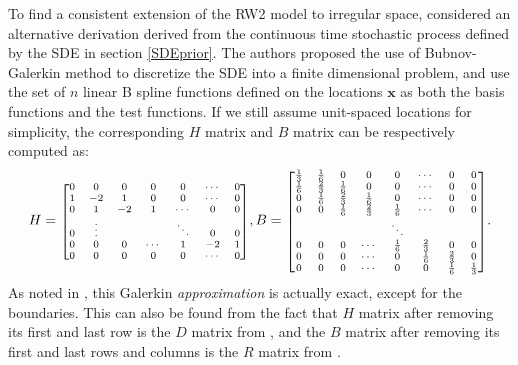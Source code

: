 \documentclass{article}
\begin{document}
To find a consistent extension of the RW2 model to irregular space, \citep{rw2} considered an alternative derivation derived from the continuous time stochastic process defined by the SDE in section \ref{SDEprior}. The authors proposed the use of Bubnov-Galerkin method to discretize the SDE into a finite dimensional problem, and use the set of $n$ linear B spline functions defined on the locations $\boldsymbol{x}$ as both the basis functions and the test functions. If we still assume unit-spaced locations for simplicity, the corresponding $H$ matrix and $B$ matrix can be respectively computed as:
\begin{equation}\label{HandB}
\begin{aligned}
H = \mbox{\scriptsize $\begin{bmatrix}
0 & 0 & 0 & 0 & 0 & \cdots & 0\\
1 & -2 & 1 & 0 & 0 & \cdots & 0\\
0 & 1 & -2 & 1 & \cdots & 0 & 0\\
0 & \vdots &  &  & \ddots & 0 & 0\\
0 & 0 & 0 & \cdots & 1 & -2 & 1\\
0 & 0 & 0 & 0 & 0 & \cdots & 0\\
\end{bmatrix}$},
B = \mbox{\scriptsize $\begin{bmatrix}
\frac{1}{3} & \frac{1}{6} & 0 & 0 & 0 & \cdots & 0 & 0\\
\frac{1}{6} & \frac{2}{3} & \frac{1}{6} & 0 & 0 & \cdots & 0 & 0\\
0 & \frac{1}{6} & \frac{2}{3} & \frac{1}{6} & 0 & \cdots & 0 & 0\\
0 & 0 & \frac{1}{6} & \frac{2}{3} & \frac{1}{6} & \cdots & 0 & 0\\
 &  &  &  & \ddots &  & & \\
 0 & 0 & 0 & \cdots & \frac{1}{6} & \frac{2}{3} & 0 & 0\\
0 & 0 & 0 & \cdots & 0 & \frac{1}{6} & \frac{2}{3} & 0\\
0 & 0 & 0 & \cdots & 0 & 0 & \frac{1}{6} & \frac{1}{3} \\
\end{bmatrix}$}.
\end{aligned}
\end{equation}
As noted in \cite{rw2}, this Galerkin \textit{approximation} is actually exact, except for the boundaries. This can also be found from the fact that $H$ matrix after removing its first and last row is the $D$ matrix from \cite{ARIMA}, and the $B$ matrix after removing its first and last rows and columns is the $R$ matrix from \cite{ARIMA}.
\end{document}

